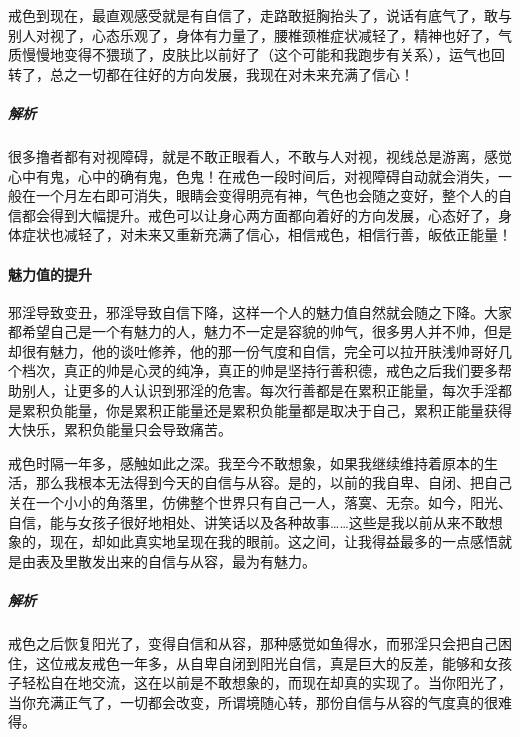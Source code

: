 \begin{case}
    戒色到现在，最直观感受就是有自信了，走路敢挺胸抬头了，说话有底气了，敢与别人对视了，心态乐观了，身体有力量了，腰椎颈椎症状减轻了，精神也好了，气质慢慢地变得不猥琐了，皮肤比以前好了（这个可能和我跑步有关系），运气也回转了，总之一切都在往好的方向发展，我现在对未来充满了信心！
    \subparagraph{解析} 很多撸者都有对视障碍，就是不敢正眼看人，不敢与人对视，视线总是游离，感觉心中有鬼，心中的确有鬼，色鬼！在戒色一段时间后，对视障碍自动就会消失，一般在一个月左右即可消失，眼睛会变得明亮有神，气色也会随之变好，整个人的自信都会得到大幅提升。戒色可以让身心两方面都向着好的方向发展，心态好了，身体症状也减轻了，对未来又重新充满了信心，相信戒色，相信行善，皈依正能量！
\end{case}

\paragraph{魅力值的提升}

邪淫导致变丑，邪淫导致自信下降，这样一个人的魅力值自然就会随之下降。大家都希望自己是一个有魅力的人，魅力不一定是容貌的帅气，很多男人并不帅，但是却很有魅力，他的谈吐修养，他的那一份气度和自信，完全可以拉开肤浅帅哥好几个档次，真正的帅是心灵的纯净，真正的帅是坚持行善积德，戒色之后我们要多帮助别人，让更多的人认识到邪淫的危害。每次行善都是在累积正能量，每次手淫都是累积负能量，你是累积正能量还是累积负能量都是取决于自己，累积正能量获得大快乐，累积负能量只会导致痛苦。

\begin{case}
    戒色时隔一年多，感触如此之深。我至今不敢想象，如果我继续维持着原本的生活，那么我根本无法得到今天的自信与从容。是的，以前的我自卑、自闭、把自己关在一个小小的角落里，仿佛整个世界只有自己一人，落寞、无奈。如今，阳光、自信，能与女孩子很好地相处、讲笑话以及各种故事……这些是我以前从来不敢想象的，现在，却如此真实地呈现在我的眼前。这之间，让我得益最多的一点感悟就是由表及里散发出来的自信与从容，最为有魅力。
    \subparagraph{解析} 戒色之后恢复阳光了，变得自信和从容，那种感觉如鱼得水，而邪淫只会把自己困住，这位戒友戒色一年多，从自卑自闭到阳光自信，真是巨大的反差，能够和女孩子轻松自在地交流，这在以前是不敢想象的，而现在却真的实现了。当你阳光了，当你充满正气了，一切都会改变，所谓境随心转，那份自信与从容的气度真的很难得。
\end{case}

